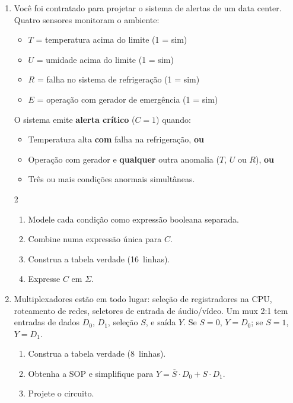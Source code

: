 \documentclass[11pt, a4paper]{article}
\begin{document}
\begin{enumerate}
\item Voc\^{e} foi contratado para projetar o sistema de alertas de um data center. Quatro sensores monitoram o ambiente:
\begin{itemize}
  \item $T$ = temperatura acima do limite (1 = sim)
  \item $U$ = umidade acima do limite (1 = sim)
  \item $R$ = falha no sistema de refrigera\c{c}\~{a}o (1 = sim)
  \item $E$ = opera\c{c}\~{a}o com gerador de emerg\^{e}ncia (1 = sim)
\end{itemize}
O sistema emite \textbf{alerta cr\'{i}tico} ($C = 1$) quando:
\begin{itemize}
  \item Temperatura alta \textbf{com} falha na refrigera\c{c}\~{a}o, \textbf{ou}
  \item Opera\c{c}\~{a}o com gerador e \textbf{qualquer} outra anomalia ($T$, $U$ ou $R$), \textbf{ou}
  \item Tr\^{e}s ou mais condi\c{c}\~{o}es anormais simult\^{a}neas.
\end{itemize}
\begin{multicols}{2}
\begin{enumerate}
  \item Modele cada condi\c{c}\~{a}o como express\~{a}o booleana separada.
  \item Combine numa express\~{a}o \'{u}nica para $C$.
  \item Construa a tabela verdade (16~linhas).
  \item Expresse $C$ em $\Sigma$.
\end{enumerate}
\end{multicols}

\item Multiplexadores est\~{a}o em todo lugar: sele\c{c}\~{a}o de registradores na CPU, roteamento de redes, seletores de entrada de \'{a}udio/v\'{i}deo. Um mux 2:1 tem entradas de dados $D_0$, $D_1$, sele\c{c}\~{a}o $S$, e sa\'{i}da $Y$. Se $S=0$, $Y=D_0$; se $S=1$, $Y=D_1$.
\begin{enumerate}
  \item Construa a tabela verdade (8~linhas).
  \item Obtenha a SOP e simplifique para $Y = \overline{S} \cdot D_0 + S \cdot D_1$.
  \item Projete o circuito.
\end{enumerate}


\end{enumerate}
\end{document}
